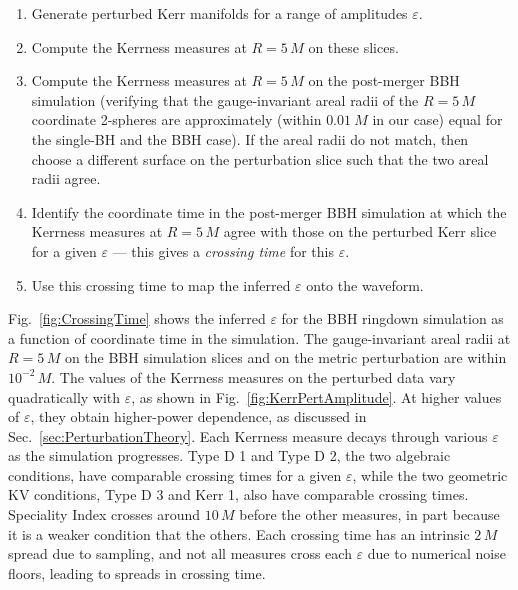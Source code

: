 \begin{enumerate}
\item Generate perturbed Kerr manifolds for a range of amplitudes $\varepsilon$.
\item Compute the Kerrness measures at $R=5\,M$ on these slices.
\item Compute the Kerrness measures at $R=5\,M$ on the post-merger BBH simulation (verifying that the gauge-invariant areal radii of the $R=5\,M$ coordinate 2-spheres are approximately (within $0.01~M$ in our case) equal for the single-BH and the BBH case).  If the areal radii do not match, then choose a different surface on the perturbation slice such that the two areal radii agree.
\item Identify the coordinate time in the post-merger BBH simulation at which the Kerrness measures at $R=5\,M$ agree with those on the perturbed Kerr slice for a given $\varepsilon$ --- this gives a \textit{crossing time} for this $\varepsilon$. %
\item Use this crossing time to map the inferred $\varepsilon$ onto the waveform. 
\end{enumerate}

\CrossingTimeFigure

Fig.~\ref{fig:CrossingTime} shows the inferred $\varepsilon$ for the BBH ringdown simulation as a function of coordinate time in the simulation. The gauge-invariant areal radii at $R = 5\,M$ on the BBH simulation slices and on the metric perturbation are within $10^{-2}\,M$. The values of the Kerrness measures on the perturbed data vary quadratically with $\varepsilon$, as shown in Fig.~\ref{fig:KerrPertAmplitude}. At higher values of $\varepsilon$, they obtain higher-power dependence, as discussed in Sec.~\ref{sec:PerturbationTheory}. Each Kerrness measure decays through various $\varepsilon$ as the simulation progresses. Type D 1 and Type D 2, the two algebraic conditions, have comparable crossing times for a given $\varepsilon$, while the two geometric KV conditions, Type D 3 and Kerr 1, also have comparable crossing times. Speciality Index crosses around $10\,M$ before the other measures, in part because it is a weaker condition that the others. Each crossing time has an intrinsic $2\,M$ spread due to sampling, and not all measures cross each $\varepsilon$ due to numerical noise floors, leading to spreads in crossing time.



